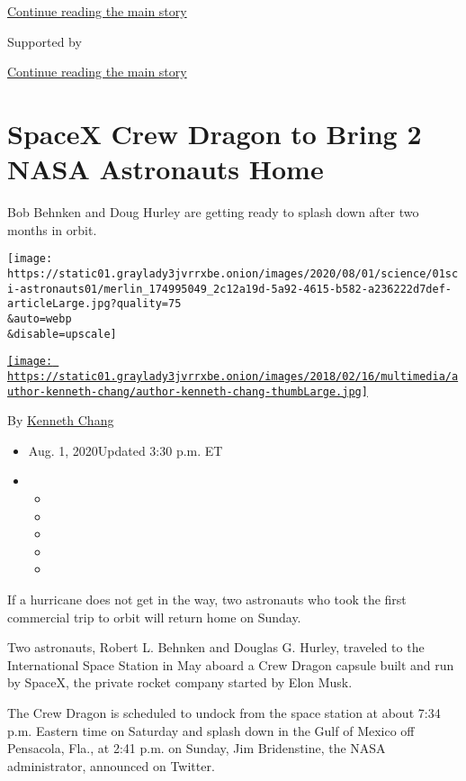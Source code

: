 \protect\hyperlink{after-top}{Continue reading the main story}

Supported by

\protect\hyperlink{after-sponsor}{Continue reading the main story}

\hypertarget{spacex-crew-dragon-to-bring-2-nasa-astronauts-home}{%
\section{SpaceX Crew Dragon to Bring 2 NASA Astronauts
Home}\label{spacex-crew-dragon-to-bring-2-nasa-astronauts-home}}

Bob Behnken and Doug Hurley are getting ready to splash down after two
months in orbit.

\texttt{[image: https://static01.graylady3jvrrxbe.onion/images/2020/08/01/science/01sci-astronauts01/merlin\_174995049\_2c12a19d-5a92-4615-b582-a236222d7def-articleLarge.jpg?quality=75\\\&auto=webp\\\&disable=upscale]}

\href{https://www.nytimes3xbfgragh.onion/by/kenneth-chang}{\texttt{[image: https://static01.graylady3jvrrxbe.onion/images/2018/02/16/multimedia/author-kenneth-chang/author-kenneth-chang-thumbLarge.jpg]}}

By \href{https://www.nytimes3xbfgragh.onion/by/kenneth-chang}{Kenneth
Chang}

\begin{itemize}
\item
  Aug. 1, 2020Updated 3:30 p.m. ET
\item
  \begin{itemize}
  \item
  \item
  \item
  \item
  \item
  \end{itemize}
\end{itemize}

If a hurricane does not get in the way, two astronauts who took the
first commercial trip to orbit will return home on Sunday.

Two astronauts, Robert L. Behnken and Douglas G. Hurley, traveled to the
International Space Station in May aboard a Crew Dragon capsule built
and run by SpaceX, the private rocket company started by Elon Musk.

The Crew Dragon is scheduled to undock from the space station at about
7:34 p.m. Eastern time on Saturday and splash down in the Gulf of Mexico
off Pensacola, Fla., at 2:41 p.m. on Sunday, Jim Bridenstine, the NASA
administrator, announced on Twitter.

